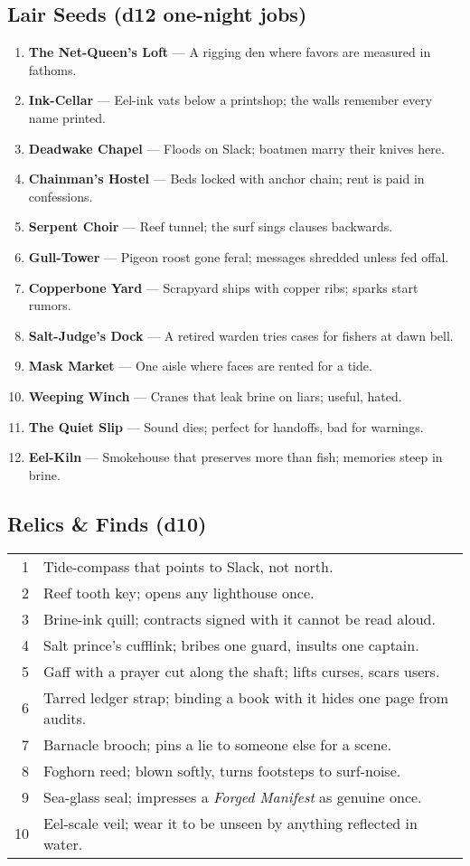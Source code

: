 \subsection*{Lair Seeds (d12 one-night jobs)}
\begin{enumerate}
  \item \textbf{The Net-Queen’s Loft} — A rigging den where favors are measured in fathoms.
  \item \textbf{Ink-Cellar} — Eel-ink vats below a printshop; the walls remember every name printed.
  \item \textbf{Deadwake Chapel} — Floods on Slack; boatmen marry their knives here.
  \item \textbf{Chainman’s Hostel} — Beds locked with anchor chain; rent is paid in confessions.
  \item \textbf{Serpent Choir} — Reef tunnel; the surf sings clauses backwards.
  \item \textbf{Gull-Tower} — Pigeon roost gone feral; messages shredded unless fed offal.
  \item \textbf{Copperbone Yard} — Scrapyard ships with copper ribs; sparks start rumors.
  \item \textbf{Salt-Judge’s Dock} — A retired warden tries cases for fishers at dawn bell.
  \item \textbf{Mask Market} — One aisle where faces are rented for a tide.
  \item \textbf{Weeping Winch} — Cranes that leak brine on liars; useful, hated.
  \item \textbf{The Quiet Slip} — Sound dies; perfect for handoffs, bad for warnings. 
  \item \textbf{Eel-Kiln} — Smokehouse that preserves more than fish; memories steep in brine. 
\end{enumerate}

\subsection*{Relics \& Finds (d10)}
\begin{tabular}{r l}
1 & Tide-compass that points to Slack, not north. \\
2 & Reef tooth key; opens any lighthouse once. \\
3 & Brine-ink quill; contracts signed with it cannot be read aloud. \\
4 & Salt prince’s cufflink; bribes one guard, insults one captain. \\
5 & Gaff with a prayer cut along the shaft; lifts curses, scars users. \\
6 & Tarred ledger strap; binding a book with it hides one page from audits. \\
7 & Barnacle brooch; pins a lie to someone else for a scene. \\
8 & Foghorn reed; blown softly, turns footsteps to surf-noise. \\
9 & Sea-glass seal; impresses a \emph{Forged Manifest} as genuine once. \\
10 & Eel-scale veil; wear it to be unseen by anything reflected in water. \\
\end{tabular}

